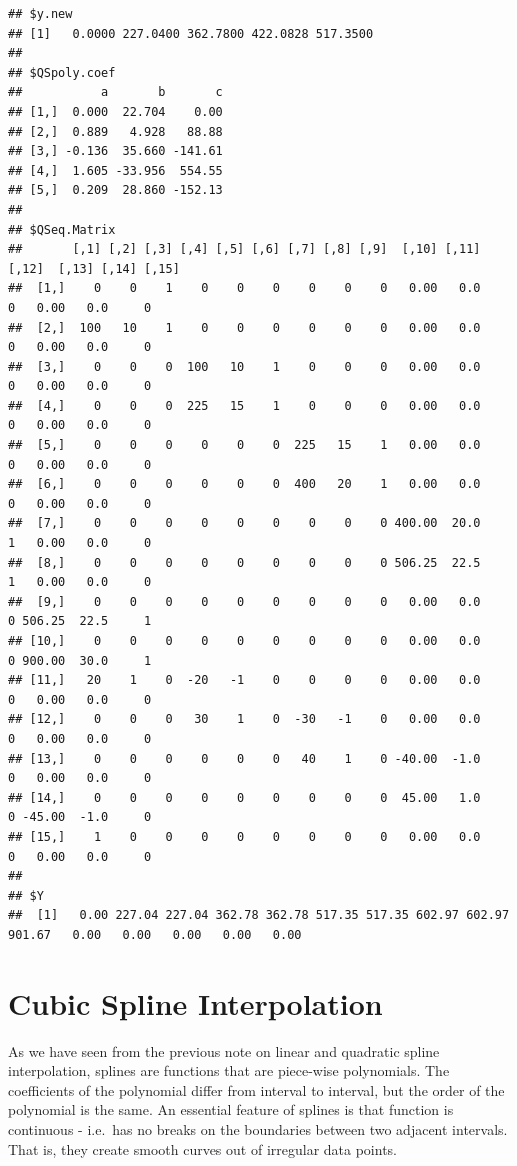 \documentclass[
]{book}
\begin{document}
\begin{verbatim}
## $y.new
## [1]   0.0000 227.0400 362.7800 422.0828 517.3500
## 
## $QSpoly.coef
##           a       b       c
## [1,]  0.000  22.704    0.00
## [2,]  0.889   4.928   88.88
## [3,] -0.136  35.660 -141.61
## [4,]  1.605 -33.956  554.55
## [5,]  0.209  28.860 -152.13
## 
## $QSeq.Matrix
##       [,1] [,2] [,3] [,4] [,5] [,6] [,7] [,8] [,9]  [,10] [,11] [,12]  [,13] [,14] [,15]
##  [1,]    0    0    1    0    0    0    0    0    0   0.00   0.0     0   0.00   0.0     0
##  [2,]  100   10    1    0    0    0    0    0    0   0.00   0.0     0   0.00   0.0     0
##  [3,]    0    0    0  100   10    1    0    0    0   0.00   0.0     0   0.00   0.0     0
##  [4,]    0    0    0  225   15    1    0    0    0   0.00   0.0     0   0.00   0.0     0
##  [5,]    0    0    0    0    0    0  225   15    1   0.00   0.0     0   0.00   0.0     0
##  [6,]    0    0    0    0    0    0  400   20    1   0.00   0.0     0   0.00   0.0     0
##  [7,]    0    0    0    0    0    0    0    0    0 400.00  20.0     1   0.00   0.0     0
##  [8,]    0    0    0    0    0    0    0    0    0 506.25  22.5     1   0.00   0.0     0
##  [9,]    0    0    0    0    0    0    0    0    0   0.00   0.0     0 506.25  22.5     1
## [10,]    0    0    0    0    0    0    0    0    0   0.00   0.0     0 900.00  30.0     1
## [11,]   20    1    0  -20   -1    0    0    0    0   0.00   0.0     0   0.00   0.0     0
## [12,]    0    0    0   30    1    0  -30   -1    0   0.00   0.0     0   0.00   0.0     0
## [13,]    0    0    0    0    0    0   40    1    0 -40.00  -1.0     0   0.00   0.0     0
## [14,]    0    0    0    0    0    0    0    0    0  45.00   1.0     0 -45.00  -1.0     0
## [15,]    1    0    0    0    0    0    0    0    0   0.00   0.0     0   0.00   0.0     0
## 
## $Y
##  [1]   0.00 227.04 227.04 362.78 362.78 517.35 517.35 602.97 602.97 901.67   0.00   0.00   0.00   0.00   0.00
\end{verbatim}

\hypertarget{cubic-spline-interpolation}{%
\chapter{Cubic Spline Interpolation}\label{cubic-spline-interpolation}}

As we have seen from the previous note on linear and quadratic spline interpolation, splines are functions that are piece-wise polynomials. The coefficients of the polynomial differ from interval to interval, but the order of the polynomial is the same. An essential feature of splines is that function is continuous - i.e.~has no breaks on the boundaries between two adjacent intervals. That is, they create smooth curves out of irregular data points.
\end{document}
